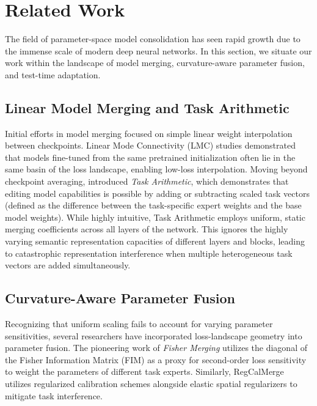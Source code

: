 \section{Related Work}
\label{sec:related_work}

The field of parameter-space model consolidation has seen rapid growth due to the immense scale of modern deep neural networks. In this section, we situate our work within the landscape of model merging, curvature-aware parameter fusion, and test-time adaptation.

\subsection{Linear Model Merging and Task Arithmetic}
Initial efforts in model merging focused on simple linear weight interpolation between checkpoints. Linear Mode Connectivity (LMC) studies \cite{frankle2020linear, entezari2021role, wortsman2022model} demonstrated that models fine-tuned from the same pretrained initialization often lie in the same basin of the loss landscape, enabling low-loss interpolation. Moving beyond checkpoint averaging, \citet{ilharco2022editing} introduced \emph{Task Arithmetic}, which demonstrates that editing model capabilities is possible by adding or subtracting scaled task vectors (defined as the difference between the task-specific expert weights and the base model weights). While highly intuitive, Task Arithmetic employs uniform, static merging coefficients across all layers of the network. This ignores the highly varying semantic representation capacities of different layers and blocks, leading to catastrophic representation interference when multiple heterogeneous task vectors are added simultaneously.

\subsection{Curvature-Aware Parameter Fusion}
Recognizing that uniform scaling fails to account for varying parameter sensitivities, several researchers have incorporated loss-landscape geometry into parameter fusion. The pioneering work of \emph{Fisher Merging} \cite{matena2022merging} utilizes the diagonal of the Fisher Information Matrix (FIM) as a proxy for second-order loss sensitivity to weight the parameters of different task experts. Similarly, RegCalMerge \cite{regcalmerge} utilizes regularized calibration schemes alongside elastic spatial regularizers to mitigate task interference. 

